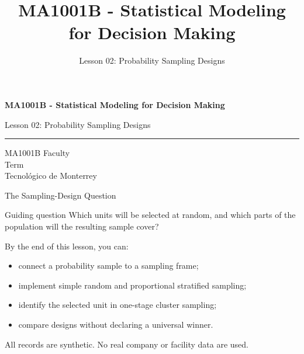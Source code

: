 \documentclass[aspectratio=169,10pt,english]{beamer}
\title{MA1001B - Statistical Modeling for Decision Making}
\subtitle{Lesson 02: Probability Sampling Designs}
\author{}
\institute{Tecnol\'ogico de Monterrey}
\date{}
\begin{document}
\begin{frame}[plain]
  \vspace{1.2cm}
  {\Large\bfseries MA1001B - Statistical Modeling for Decision Making\par}
  \vspace{0.7cm}
  {\large Lesson 02: Probability Sampling Designs\par}
  \vspace{0.7cm}
  {\color{TecRojo}\rule{\textwidth}{1.2pt}}
  \vspace{0.8cm}

  MA1001B Faculty\\[0.3cm]
  Term\\[0.3cm]
  Tecnol\'ogico de Monterrey
\end{frame}

\begin{frame}{The Sampling-Design Question}
  \begin{alertblock}{Guiding question}
    Which units will be selected at random, and which parts of the population
    will the resulting sample cover?
  \end{alertblock}

  \vspace{0.5em}
  By the end of this lesson, you can:
  \begin{itemize}
    \item connect a probability sample to a sampling frame;
    \item implement simple random and proportional stratified sampling;
    \item identify the selected unit in one-stage cluster sampling;
    \item compare designs without declaring a universal winner.
  \end{itemize}

  \vfill
  \scriptsize All records are synthetic. No real company or facility data are used.
\end{frame}
\end{document}
